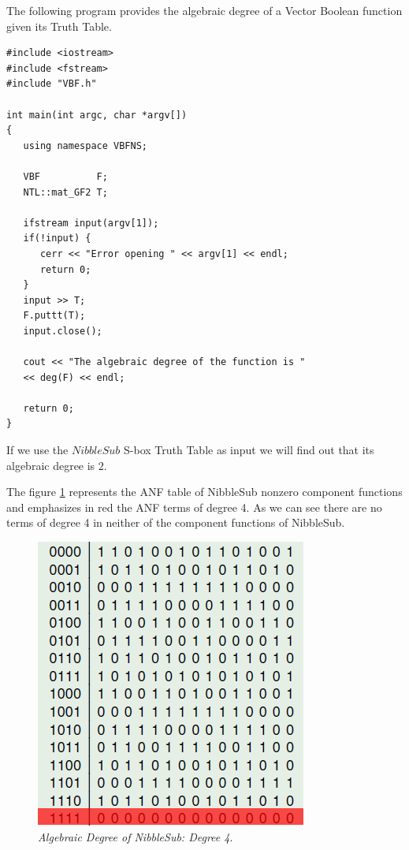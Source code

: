 \begin{example}\label{ex:degNibble}
The following program provides the algebraic degree of a Vector Boolean function given its Truth Table. 

\begin{verbatim}
#include <iostream>
#include <fstream>
#include "VBF.h"

int main(int argc, char *argv[])
{
   using namespace VBFNS;

   VBF          F;
   NTL::mat_GF2 T;

   ifstream input(argv[1]);
   if(!input) {
      cerr << "Error opening " << argv[1] << endl;
      return 0;
   }
   input >> T;
   F.puttt(T);
   input.close();

   cout << "The algebraic degree of the function is " 
   << deg(F) << endl;

   return 0;
}
\end{verbatim}

If we use the $NibbleSub$ S-box Truth Table as input we will find out that its algebraic degree is $2$.

The figure \ref{fig:deg1} represents the ANF table of NibbleSub nonzero
component functions and emphasizes in red the ANF terms of degree 4. As we can see there are no terms of degree 4 in neither of the component functions of NibbleSub.

\begin{figure}[htbp!]
\centering
\includegraphics{deg1}
\caption[Algebraic Degree of NibbleSub: Degree 4]{\textit{Algebraic Degree of NibbleSub: Degree 4}.}
\label{fig:deg1}
\end{figure}


\end{example}
